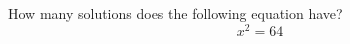 \documentclass{ximera}
\author{David Kish}
\begin{document}
\begin{exercise}
How many solutions does the following equation have? \\
\[
x^2=64
\]
\begin{multipleChoice}  
\end{multipleChoice}  
\end{exercise}
\end{document}
